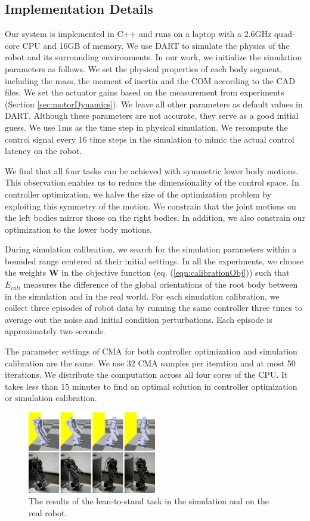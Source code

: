 \subsection{Implementation Details}

Our system is implemented in C++ and runs on a laptop with a 2.6GHz quad-core CPU and 16GB of memory. We use DART to simulate the physics of the robot and its surrounding environments. In our work, we initialize the simulation parameters as follows. We set the physical properties of each body segment, including the mass, the moment of inertia and the COM according to the CAD files. We set the actuator gains based on the measurement from experiments (Section \ref{sec:motorDynamics}). We leave all other parameters as default values in DART. Although these parameters are not accurate, they serve as a good initial guess. We use 1ms as the time step in physical simulation. We recompute the control signal every 16 time steps in the simulation to mimic the actual control latency on the robot.

We find that all four tasks can be achieved with symmetric lower body motions. This observation enables us to reduce the dimensionality of the control space. In controller optimization, we halve the size of the optimization problem by exploiting this symmetry of the motion. We constrain that the joint motions on the left bodies mirror those on the right bodies. In addition, we also constrain our optimization to the lower body motions.

During simulation calibration, we search for the simulation parameters within a bounded range centered at their initial settings. In all the experiments, we choose the weights $\mathbf{W}$ in the objective function (eq. (\ref{eqn:calibrationObj})) such that $E_{cali}$ measures the difference of the global orientations of the root body between in the simulation and in the real world. For each simulation calibration, we collect three episodes of robot data by running the same controller three times to average out the noise and initial condition perturbations. Each episode is approximately two seconds.

The parameter settings of CMA for both controller optimization and simulation calibration are the same. We use 32 CMA samples per iteration and at most 50 iterations. We distribute the computation across all four cores of the CPU. It takes less than 15 minutes to find an optimal solution in controller optimization or simulation calibration.

\begin{figure}[!t]
  \centering
  \includegraphics[width=0.5\textwidth]{figures/lean2Stand}
  \caption{The results of the lean-to-stand task in the simulation and on the real robot.}
  \label{fig:lean2Stand}
\end{figure}

